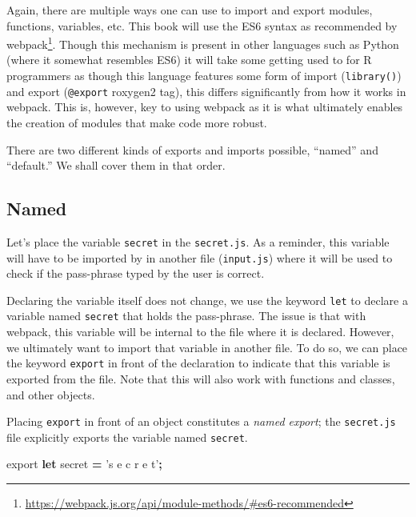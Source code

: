 \documentclass[10pt,]{krantz}
\makeatletter
\newenvironment{Shaded}{\begin{snugshade}}{\end{snugshade}}
\newcommand{\ImportTok}[1]{#1}
\newcommand{\KeywordTok}[1]{\textcolor[rgb]{0.27,0.27,0.27}{\textbf{#1}}}
\newcommand{\NormalTok}[1]{#1}
\newcommand{\OperatorTok}[1]{\textcolor[rgb]{0.43,0.43,0.43}{\textbf{#1}}}
\newcommand{\StringTok}[1]{\textcolor[rgb]{0.5,0.5,0.5}{#1}}
\renewcommand{\href}[2]{#2\footnote{\url{#1}}}
\newenvironment{kframe}{%
\medskip{}
\setlength{\fboxsep}{.8em}
 \def\at@end@of@kframe{}%
 \ifinner\ifhmode%
  \def\at@end@of@kframe{\end{minipage}}%
  \begin{minipage}{\columnwidth}%
 \fi\fi%
 \def\FrameCommand##1{\hskip\@totalleftmargin \hskip-\fboxsep
 \colorbox{shadecolor}{##1}\hskip-\fboxsep
     \hskip-\linewidth \hskip-\@totalleftmargin \hskip\columnwidth}%
 \MakeFramed {\advance\hsize-\width
   \@totalleftmargin\z@ \linewidth\hsize
   \@setminipage}}%
 {\par\unskip\endMakeFramed%
 \at@end@of@kframe}
\renewenvironment{Shaded}{\begin{kframe}}{\end{kframe}}
\makeatother
\begin{document}
Again, there are multiple ways one can use to import and export modules, functions, variables, etc. This book will use the ES6 syntax as \href{https://webpack.js.org/api/module-methods/\#es6-recommended}{recommended by webpack}. Though this mechanism is present in other languages such as Python (where it somewhat resembles ES6) it will take some getting used to for R programmers as though this language features some form of import (\texttt{library()}) and export (\texttt{@export} roxygen2 tag), this differs significantly from how it works in webpack. This is, however, key to using webpack as it is what ultimately enables the creation of modules that make code more robust.

There are two different kinds of exports and imports possible, ``named'' and ``default.'' We shall cover them in that order.

\hypertarget{webpack-intro-import-export-named}{%
\subsection{Named}\label{webpack-intro-import-export-named}}

Let's place the variable \texttt{secret} in the \texttt{secret.js}. As a reminder, this variable will have to be imported by in another file (\texttt{input.js}) where it will be used to check if the pass-phrase typed by the user is correct.

Declaring the variable itself does not change, we use the keyword \texttt{let} to declare a variable named \texttt{secret} that holds the pass-phrase. The issue is that with webpack, this variable will be internal to the file where it is declared. However, we ultimately want to import that variable in another file. To do so, we can place the keyword \texttt{export} in front of the declaration to indicate that this variable is exported from the file. Note that this will also work with functions and classes, and other objects.

Placing \texttt{export} in front of an object constitutes a \emph{named export}; the \texttt{secret.js} file explicitly exports the variable named \texttt{secret}.

\begin{Shaded}
\begin{Highlighting}[]
\ImportTok{export} \KeywordTok{let}\NormalTok{ secret }\OperatorTok{=} \StringTok{'s e c r e t'}\OperatorTok{;}
\end{Highlighting}
\end{Shaded}
\end{document}

